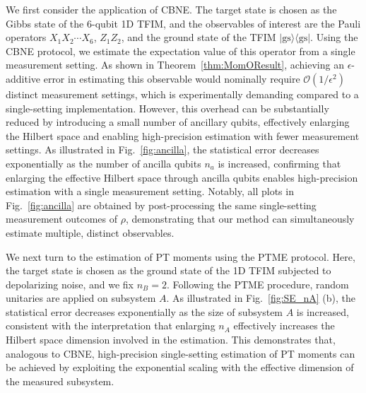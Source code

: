 \documentclass[aps,prl,twocolumn,nofootinbib,superscriptaddress,10pt]{revtex4-2}
\def\>{\rangle}
\def\<{\langle}
\theoremstyle{plain}
\theoremstyle{definition}
\begin{document}
We first consider the application of CBNE. The target state is chosen as the Gibbs state of the 6-qubit 1D TFIM, and the observables of interest are the Pauli operators $X_1X_2\cdots X_6$, $Z_1Z_2$, and the ground state of the TFIM $|\mathrm{gs}\>\<\mathrm{gs}|$. Using the CBNE protocol, we estimate the expectation value of this operator from a single measurement setting. As shown in Theorem~\ref{thm:MomOResult}, achieving an $\epsilon$-additive error in estimating this observable would nominally require $\mathcal{O}(1/\epsilon^2)$ distinct measurement settings, which is experimentally demanding compared to a single-setting implementation. However, this overhead can be substantially reduced by introducing a small number of ancillary qubits, effectively enlarging the Hilbert space and enabling high-precision estimation with fewer measurement settings. As illustrated in Fig.~\ref{fig:ancilla}, the statistical error decreases exponentially as the number of ancilla qubits $n_a$ is increased, confirming that enlarging the effective Hilbert space through ancilla qubits enables high-precision estimation with a single measurement setting. Notably, all plots in Fig.~\ref{fig:ancilla} are obtained by post-processing the same single-setting measurement outcomes of $\rho$, demonstrating that our method can simultaneously estimate multiple, distinct observables.

We next turn to the estimation of PT moments using the PTME protocol. Here, the target state is chosen as the ground state of the 1D TFIM subjected to depolarizing noise, and we fix $n_B = 2$. Following the PTME procedure, random unitaries are applied on subsystem $A$. As illustrated in Fig.~\ref{fig:SE_nA} (b), the statistical error decreases exponentially as the size of subsystem $A$ is increased, consistent with the interpretation that enlarging $n_A$ effectively increases the Hilbert space dimension involved in the estimation. This demonstrates that, analogous to CBNE, high-precision single-setting estimation of PT moments can be achieved by exploiting the exponential scaling with the effective dimension of the measured subsystem.
\fi
\end{document}
